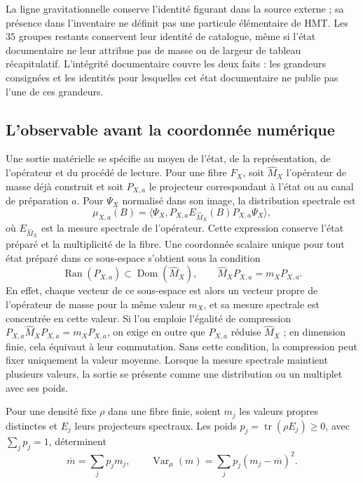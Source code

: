 La ligne gravitationnelle conserve l'identité figurant dans la source externe ;
sa présence dans l'inventaire ne définit pas une particule élémentaire de HMT.
Les \(35\) groupes restants conservent leur identité de catalogue, même si
l'état documentaire ne leur attribue pas de masse ou de largeur de tableau récapitulatif. L'intégrité
documentaire couvre les deux faits : les grandeurs consignées et les identités
pour lesquelles cet état documentaire ne publie pas l'une de ces grandeurs.

\subsection{L’observable avant la coordonnée numérique}
\label{vi:subsec:vi-tipos-observable}

Une sortie matérielle se spécifie au moyen de l’état, de la représentation,
de l’opérateur et du procédé de lecture. Pour une fibre \(F_X\), soit
\(\widehat M_X\) l’opérateur de masse déjà construit et soit \(P_{X,a}\)
le projecteur correspondant à l’état ou au canal de préparation \(a\).
Pour \(\Psi_X\) normalisé dans son image, la distribution spectrale est
\[
 \mu_{X,a}(B)
 =\langle\Psi_X,
   P_{X,a}E_{\widehat M_X}(B)P_{X,a}\Psi_X\rangle,
\]
où \(E_{\widehat M_X}\) est la mesure spectrale de l’opérateur. Cette
expression conserve l’état préparé et la multiplicité de la fibre.
Une coordonnée scalaire unique pour tout état préparé dans ce sous-espace
s’obtient sous la condition
\[
 \operatorname{Ran}(P_{X,a})\subset\operatorname{Dom}(\widehat M_X),
 \qquad \widehat M_XP_{X,a}=m_XP_{X,a}.
\]
En effet, chaque vecteur de ce sous-espace est alors un vecteur propre de
l’opérateur de masse pour la même valeur \(m_X\), et sa mesure spectrale est
concentrée en cette valeur. Si l’on emploie l’égalité de compression
\(P_{X,a}\widehat M_XP_{X,a}=m_XP_{X,a}\), on exige en outre que
\(P_{X,a}\) réduise \(\widehat M_X\) ; en dimension finie, cela équivaut
à leur commutation. Sans cette condition, la compression peut fixer uniquement
la valeur moyenne. Lorsque la mesure spectrale maintient plusieurs valeurs, la
sortie se présente comme une distribution ou un multiplet avec ses poids.

Pour une densité fixe \(\rho\) dans une fibre finie, soient \(m_j\)
les valeurs propres distinctes et \(E_j\) leurs projecteurs spectraux.
Les poids \(p_j=\operatorname{tr}(\rho E_j)\geq0\), avec
\(\sum_jp_j=1\), déterminent
\[
 \overline m=\sum_jp_jm_j,\qquad
 \operatorname{Var}_{\mu}(m)=\sum_jp_j(m_j-\overline m)^2.
\]
